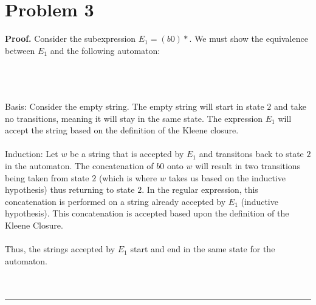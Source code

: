 \documentclass{article}%
\newenvironment{proof}[1][Proof]{\noindent\textbf{#1.} }{\ \rule{0.5em}{0.5em}}
\begin{document}
\section{Problem 3}

\begin{proof}
    Consider the subexpression $E_1 = (b0)*$. We must show the equivalence between $E_1$ and the following automaton:\\
    \\
    \begin{center}
    \end{center}\\
    \\
    Basis: Consider the empty string. The empty string will start in state $2$ and take no transitions, meaning it
    will stay in the same state. The expression $E_1$ will accept the string based on the definition of the Kleene
    closure.\\
    \\
    Induction: Let $w$ be a string that is accepted by $E_1$ and transitons back to state $2$ in the automaton. The
    concatenation of $b0$ onto $w$ will result in two transitions being taken from state $2$ (which is where $w$ takes
    us based on the inductive hypothesis) thus returning to state $2$. In the regular expression, this concatenation
    is performed on a string already accepted by $E_1$ (inductive hypothesis). This concatenation is accepted based upon
    the definition of the Kleene Closure.\\
    \\
    Thus, the strings accepted by $E_1$ start and end in the same state for the automaton.\\
    \\
\end{proof}
\end{document}
